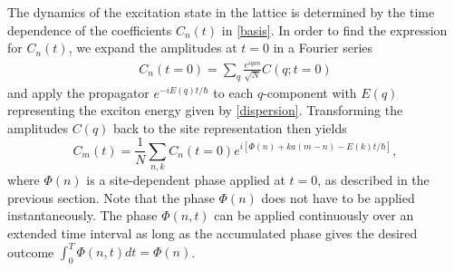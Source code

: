 The dynamics of the excitation state in the lattice is determined by the time dependence
of the coefficients $C_n(t)$ in  \autoref{basis}. In order to find the expression for $C_n(t)$, we expand the amplitudes
 at $t=0$ in a Fourier series
\begin{eqnarray}
C_n(t=0) = \sum_q
\frac{e^{iq a n}}{\sqrt{N}}C(q; t=0)
\end{eqnarray}
and apply the propagator $e^{-iE(q)t/\hbar}$ to each $q$-component with
$E(q)$ representing the exciton energy given by \autoref{dispersion}.
Transforming the amplitudes $C(q)$ back to the site representation then yields
\begin{equation}
C_m(t) = \frac{1}{N} \sum_{n,k} C_n(t=0) e^{i [\Phi(n) +  k a
(m-n) - E(k) t/\hbar ]},
 \label{Cn(t)}
\end{equation}
where $\Phi(n)$ is a
site-dependent phase applied at $t=0$, as described in the previous section.
Note that the phase $\Phi(n)$ does not have to be applied
instantaneously. The phase  $\Phi(n, t)$ can be applied continuously over an
extended time interval as long as the accumulated phase gives the desired outcome  $\int_0^{T}\Phi(n, t)dt = \Phi(n)$.


